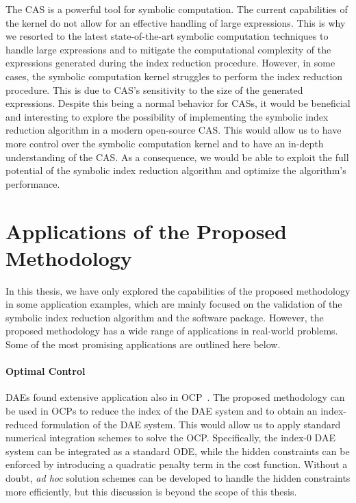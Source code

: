 The \Maple{} \ac{CAS} is a powerful tool for symbolic computation. The current capabilities of the \Maple{} kernel do not allow for an effective handling of large expressions. This is why we resorted to the latest state-of-the-art symbolic computation techniques to handle large expressions and to mitigate the computational complexity of the expressions generated during the index reduction procedure. However, in some cases, the \Maple{} symbolic computation kernel struggles to perform the index reduction procedure. This is due to \ac{CAS}'s sensitivity to the size of the generated expressions. Despite this being a normal behavior for \acp{CAS}, it would be beneficial and interesting to explore the possibility of implementing the symbolic index reduction algorithm in a modern open-source \ac{CAS}. This would allow us to have more control over the symbolic computation kernel and to have an in-depth understanding of the \ac{CAS}. As a consequence, we would be able to exploit the full potential of the symbolic index reduction algorithm and optimize the algorithm's performance.

\section{Applications of the Proposed Methodology}

In this thesis, we have only explored the capabilities of the proposed methodology in some application examples, which are mainly focused on the validation of the symbolic index reduction algorithm and the \Indigo{} software package. However, the proposed methodology has a wide range of applications in real-world problems. Some of the most promising applications are outlined here below.

\paragraph{Optimal Control}

\acp{DAE} found extensive application also in \ac{OCP}~\cite{gerdts2012optimal, gerdts2003optimal, gerdts2005gradient}. The proposed methodology can be used in \acp{OCP} to reduce the index of the \ac{DAE} system and to obtain an index-reduced formulation of the \ac{DAE} system. This would allow us to apply standard numerical integration schemes to solve the \ac{OCP}. Specifically, the index-0 \ac{DAE} system can be integrated as a standard \ac{ODE}, while the hidden constraints can be enforced by introducing a quadratic penalty term in the cost function. Without a doubt, \emph{ad hoc} solution schemes can be developed to handle the hidden constraints more efficiently, but this discussion is beyond the scope of this thesis.

